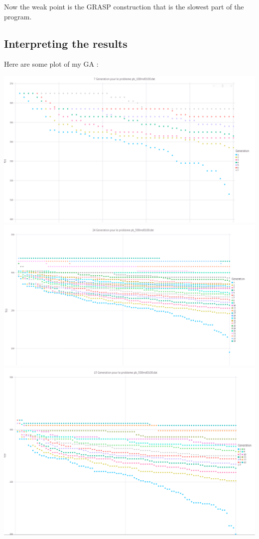 \documentclass[12pt]{article}
\begin{document}
	Now the weak point is the GRASP construction that is the slowest part of the program.
	\pagebreak
	\subsection{Interpreting the results}
	Here are some plot of my GA :
	\begin{center}
		\includegraphics[scale=0.5]{100rnd0100.png}
		\includegraphics[scale=0.5]{500rnd0101.png}
		\includegraphics[scale=0.5]{500rnd0102.png}

\end{center}
\end{document}
